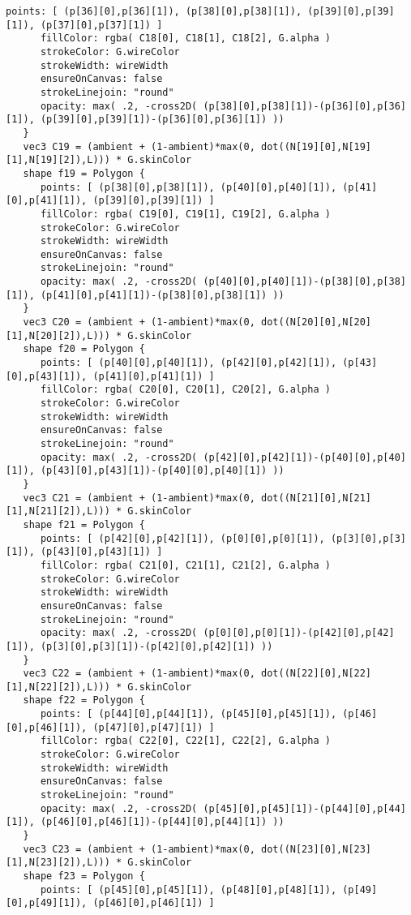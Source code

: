 \begin{lstlisting}[language=Sty-RT,escapechar=@]
      points: [ (p[36][0],p[36][1]), (p[38][0],p[38][1]), (p[39][0],p[39][1]), (p[37][0],p[37][1]) ]
      fillColor: rgba( C18[0], C18[1], C18[2], G.alpha )
      strokeColor: G.wireColor
      strokeWidth: wireWidth
      ensureOnCanvas: false
      strokeLinejoin: "round"
      opacity: max( .2, -cross2D( (p[38][0],p[38][1])-(p[36][0],p[36][1]), (p[39][0],p[39][1])-(p[36][0],p[36][1]) ))
   }
   vec3 C19 = (ambient + (1-ambient)*max(0, dot((N[19][0],N[19][1],N[19][2]),L))) * G.skinColor
   shape f19 = Polygon {
      points: [ (p[38][0],p[38][1]), (p[40][0],p[40][1]), (p[41][0],p[41][1]), (p[39][0],p[39][1]) ]
      fillColor: rgba( C19[0], C19[1], C19[2], G.alpha )
      strokeColor: G.wireColor
      strokeWidth: wireWidth
      ensureOnCanvas: false
      strokeLinejoin: "round"
      opacity: max( .2, -cross2D( (p[40][0],p[40][1])-(p[38][0],p[38][1]), (p[41][0],p[41][1])-(p[38][0],p[38][1]) ))
   }
   vec3 C20 = (ambient + (1-ambient)*max(0, dot((N[20][0],N[20][1],N[20][2]),L))) * G.skinColor
   shape f20 = Polygon {
      points: [ (p[40][0],p[40][1]), (p[42][0],p[42][1]), (p[43][0],p[43][1]), (p[41][0],p[41][1]) ]
      fillColor: rgba( C20[0], C20[1], C20[2], G.alpha )
      strokeColor: G.wireColor
      strokeWidth: wireWidth
      ensureOnCanvas: false
      strokeLinejoin: "round"
      opacity: max( .2, -cross2D( (p[42][0],p[42][1])-(p[40][0],p[40][1]), (p[43][0],p[43][1])-(p[40][0],p[40][1]) ))
   }
   vec3 C21 = (ambient + (1-ambient)*max(0, dot((N[21][0],N[21][1],N[21][2]),L))) * G.skinColor
   shape f21 = Polygon {
      points: [ (p[42][0],p[42][1]), (p[0][0],p[0][1]), (p[3][0],p[3][1]), (p[43][0],p[43][1]) ]
      fillColor: rgba( C21[0], C21[1], C21[2], G.alpha )
      strokeColor: G.wireColor
      strokeWidth: wireWidth
      ensureOnCanvas: false
      strokeLinejoin: "round"
      opacity: max( .2, -cross2D( (p[0][0],p[0][1])-(p[42][0],p[42][1]), (p[3][0],p[3][1])-(p[42][0],p[42][1]) ))
   }
   vec3 C22 = (ambient + (1-ambient)*max(0, dot((N[22][0],N[22][1],N[22][2]),L))) * G.skinColor
   shape f22 = Polygon {
      points: [ (p[44][0],p[44][1]), (p[45][0],p[45][1]), (p[46][0],p[46][1]), (p[47][0],p[47][1]) ]
      fillColor: rgba( C22[0], C22[1], C22[2], G.alpha )
      strokeColor: G.wireColor
      strokeWidth: wireWidth
      ensureOnCanvas: false
      strokeLinejoin: "round"
      opacity: max( .2, -cross2D( (p[45][0],p[45][1])-(p[44][0],p[44][1]), (p[46][0],p[46][1])-(p[44][0],p[44][1]) ))
   }
   vec3 C23 = (ambient + (1-ambient)*max(0, dot((N[23][0],N[23][1],N[23][2]),L))) * G.skinColor
   shape f23 = Polygon {
      points: [ (p[45][0],p[45][1]), (p[48][0],p[48][1]), (p[49][0],p[49][1]), (p[46][0],p[46][1]) ]

\end{lstlisting}
